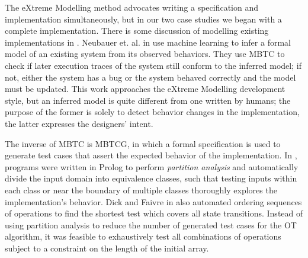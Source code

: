 \documentclass{vldb}
\begin{document}
The eXtreme Modelling method advocates writing a specification and implementation simultaneously, but in our two case studies we began with a complete implementation. 
There is some discussion of modelling existing implementations in \cite{Newcombe2014UseOfFormalMethodsAmazon}.
Neubauer et. al. in \cite{Neubauer12AutomatedContinuousQualityAssurance} use machine learning to infer a formal model of an existing system from its observed behaviors.
They use MBTC to check if later execution traces of the system still conform to the inferred model; if not, either the system has a bug or the system behaved correctly and the model must be updated.
This work approaches the eXtreme Modelling development style, but an inferred model is quite different from one written by humans; the purpose of the former is solely to detect behavior changes in the implementation, the latter expresses the designers' intent.

The inverse of MBTC is MBTCG, in which a formal specification is used to generate test cases that assert the expected behavior of the implementation. In \cite{Dick93AutomatingGenerationOfTests, Legeard02AutomatedBoundaryTesting}, programs were written in Prolog to perform \textit{partition analysis} and automatically divide the input domain into equivalence classes, such that testing inputs within each class or near the boundary of multiple classes thoroughly explores the implementation's behavior. Dick and Faivre in \cite{Dick93AutomatingGenerationOfTests} also automated ordering sequences of operations to find the shortest test which covers all state transitions. Instead of using partition analysis to reduce the number of generated test cases for the OT algorithm, it was feasible to exhaustively test all combinations of operations subject to a constraint on the length of the initial array.
\end{document}

